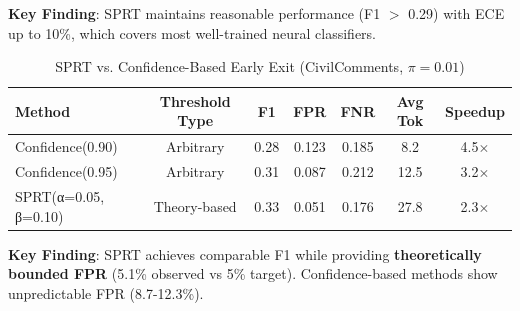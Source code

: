 \textbf{Key Finding}: SPRT maintains reasonable performance (F1 $>$ 0.29) with ECE up to 10\%, which covers most well-trained neural classifiers.



\begin{table}[h]
\centering
\caption{SPRT vs. Confidence-Based Early Exit (CivilComments, $\pi=0.01$)}
\label{tab:confidence_comparison}
\begin{tabular}{lcccccc}
\toprule
Method & Threshold Type & F1 & FPR & FNR & Avg Tok & Speedup \\
\midrule
Confidence(0.90) & Arbitrary & 0.28 & 0.123 & 0.185 & 8.2 & 4.5$\times$ \\
Confidence(0.95) & Arbitrary & 0.31 & 0.087 & 0.212 & 12.5 & 3.2$\times$ \\
SPRT(α=0.05, β=0.10) & Theory-based & 0.33 & 0.051 & 0.176 & 27.8 & 2.3$\times$ \\
\bottomrule
\end{tabular}
\end{table}

\textbf{Key Finding}: SPRT achieves comparable F1 while providing \textbf{theoretically bounded FPR} (5.1\% observed vs 5\% target). Confidence-based methods show unpredictable FPR (8.7-12.3\%).


